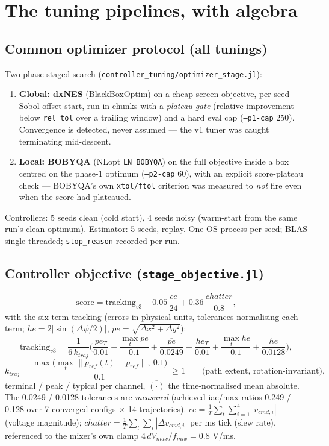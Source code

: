 \documentclass[11pt]{article}
\begin{document}
\section{The tuning pipelines, with algebra}
\label{app:tuning}

\subsection{Common optimizer protocol (all tunings)}
Two-phase staged search (\texttt{controller\_tuning/optimizer\_stage.jl}):
\begin{enumerate}[nosep]
\item \textbf{Global: dxNES} (BlackBoxOptim) on a cheap screen objective, per-seed
      Sobol-offset start, run in chunks with a \emph{plateau gate} (relative improvement
      below \texttt{rel\_tol} over a trailing window) and a hard eval cap
      (\texttt{--p1-cap} 250). Convergence is detected, never assumed --- the v1 tuner was
      caught terminating mid-descent.
\item \textbf{Local: BOBYQA} (NLopt \texttt{LN\_BOBYQA}) on the full objective inside a
      box centred on the phase-1 optimum (\texttt{--p2-cap} 60), with an explicit
      score-plateau check --- BOBYQA's own \texttt{xtol/ftol} criterion was measured to
      \emph{not} fire even when the score had plateaued.
\end{enumerate}
Controllers: 5 seeds clean (cold start), 4 seeds noisy (warm-start from the same run's
clean optimum). Estimator: 5 seeds, replay. One OS process per seed; BLAS single-threaded;
\texttt{stop\_reason} recorded per run.

\subsection{Controller objective (\texttt{stage\_objective.jl})}
\begin{equation}
\text{score} = \text{tracking}_{v3} + 0.05\,\frac{ce}{24} + 0.36\,\frac{chatter}{0.8},
\end{equation}
with the six-term tracking (errors in physical units, tolerances normalising each term;
$he=2|\sin(\Delta\psi/2)|$, $pe=\sqrt{\Delta x^2+\Delta y^2}$):
\begin{equation}
\text{tracking}_{v3}=\frac{1}{6\,k_{traj}}\Big(
\frac{pe_T}{0.01}+\frac{\max_t pe}{0.1}+\frac{\overline{pe}}{0.0249}
+\frac{he_T}{0.01}+\frac{\max_t he}{0.1}+\frac{\overline{he}}{0.0128}\Big),
\end{equation}
\begin{equation}
k_{traj}=\frac{\max\big(\max_t\|p_{ref}(t)-\bar p_{ref}\|,\ 0.1\big)}{0.1}\ \ge 1
\qquad\text{(path extent, rotation-invariant)},
\end{equation}
terminal / peak / typical per channel, $\overline{(\cdot)}$ the time-normalised mean
absolute. The 0.0249 / 0.0128 tolerances are \emph{measured} (achieved iae/max ratios
0.249 / 0.128 over 7 converged configs $\times$ 14 trajectories).
$ce=\frac{1}{T}\sum_t\sum_{i=1}^4|v_{cmd,i}|$ (voltage magnitude);
$chatter=\frac{1}{T}\sum_t\sum_i|\Delta v_{cmd,i}|$ per ms tick (slew rate), referenced
to the mixer's own clamp $4\,dV_{max}/f_{mix}=0.8$ V/ms.
\end{document}
